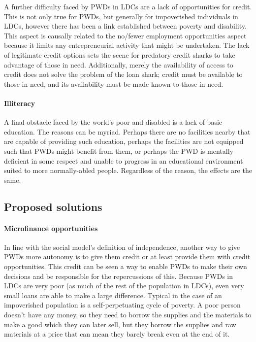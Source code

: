 \documentclass[a4paper]{article}
\begin{document}
A further difficulty faced by PWDs in LDCs are a lack of opportunities for
credit. This is not only true for PWDs, but generally for impoverished
individuals in LDCs, however there has been a link established between poverty
and disability. This aspect is causally related to the no/fewer employment
opportunities aspect because it limits any entrepreneurial activity that might
be undertaken. The lack of legitimate credit options sets the scene for
predatory credit sharks to take advantage of those in need. Additionally,
merely the availability of access to credit does not solve the problem of the
loan shark; credit must be available to those in need, and its availability
must be made known to those in need.


\paragraph{Illiteracy}

A final obstacle faced by the world’s poor and disabled is a lack of basic
education. The reasons can be myriad. Perhaps there are no facilities nearby
that are capable of providing such education, perhaps the facilities are not
equipped such that PWDs might benefit from them, or perhaps the PWD is
mentally deficient in some respect and unable to progress in an educational
environment suited to more normally-abled people. Regardless of the reason,
the effects are the same.




\subsection{Proposed solutions}

\paragraph{Microfinance opportunities}

In line with the social model's definition of independence, another way to
give PWDs more autonomy is to give them credit or at least provide them with
credit opportunities. This credit can be seen a way to enable PWDs to make
their own decisions and be responsible for the repercussions of this. Because
PWDs in LDCs are very poor (as much of the rest of the population in LDCs),
even very small loans are able to make a large difference. Typical in the case
of an impoverished population is a self-perpetuating cycle of poverty. A poor
person doesn't have any money, so they need to borrow the supplies and the
materials to make a good which they can later sell, but they borrow the
supplies and raw materials at a price that can mean they barely break even at
the end of it.
\end{document}
